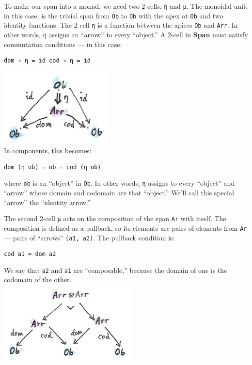 To make our span into a monad, we need two 2-cells, \texttt{η} and
\texttt{μ}. The monoidal unit, in this case, is the trivial span from
\texttt{Ob} to \texttt{Ob} with the apex at \texttt{Ob} and two identity
functions. The 2-cell \texttt{η} is a function between the apices
\texttt{Ob} and \texttt{Arr}. In other words, \texttt{η} assigns an
``arrow'' to every ``object.'' A 2-cell in \textbf{Span} must satisfy
commutation conditions --- in this case:

\begin{verbatim}
dom ∘ η = id cod ∘ η = id
\end{verbatim}

\includegraphics[width=2.27083in]{images/spanunit.png}\\
In components, this becomes:

\begin{verbatim}
dom (η ob) = ob = cod (η ob)
\end{verbatim}

where \texttt{ob} is an ``object'' in \texttt{Ob}. In other words,
\texttt{η} assigns to every ``object'' and ``arrow'' whose domain and
codomain are that ``object.'' We'll call this special ``arrow'' the
``identity arrow.''

The second 2-cell \texttt{μ} acts on the composition of the span
\texttt{Ar} with itself. The composition is defined as a pullback, so
its elements are pairs of elements from \texttt{Ar} --- pairs of
``arrows'' \texttt{(a1,\ a2)}. The pullback condition is:

\begin{verbatim}
cod a1 = dom a2
\end{verbatim}

We say that \texttt{a2} and \texttt{a1} are ``composable,'' because the
domain of one is the codomain of the other.\\
\includegraphics[width=2.75000in]{images/spanmul.png}

